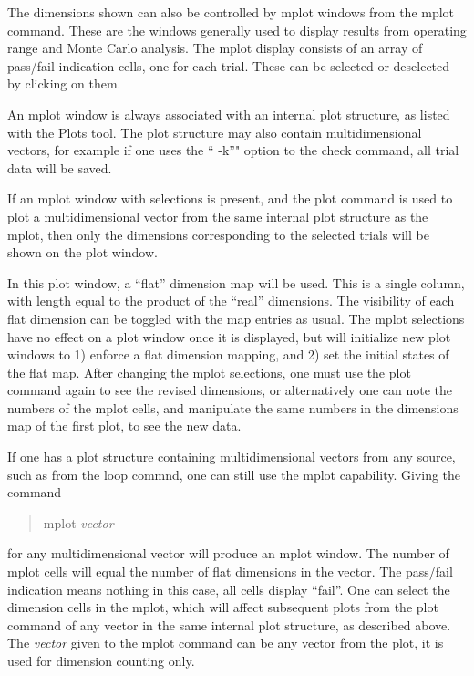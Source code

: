 The dimensions shown can also be controlled by mplot windows from the
{\cb mplot} command.  These are the windows generally used to display
results from operating range and Monte Carlo analysis.  The mplot
display consists of an array of pass/fail indication cells, one for
each trial.  These can be selected or deselected by clicking on them.

An mplot window is always associated with an internal plot structure,
as listed with the {\cb Plots} tool.  The plot structure may also
contain multidimensional vectors, for example if one uses the ``{\vt
-k}''" option to the {\cb check} command, all trial data will be
saved.

If an mplot window with selections is present, and the {\cb plot}
command is used to plot a multidimensional vector from the same
internal plot structure as the mplot, then only the dimensions
corresponding to the selected trials will be shown on the plot window.

In this plot window, a ``flat'' dimension map will be used.  This is a
single column, with length equal to the product of the ``real''
dimensions.  The visibility of each flat dimension can be toggled with
the map entries as usual.  The mplot selections have no effect on a
plot window once it is displayed, but will initialize new plot windows
to 1) enforce a flat dimension mapping, and 2) set the initial states
of the flat map.  After changing the mplot selections, one must use
the {\cb plot} command again to see the revised dimensions, or
alternatively one can note the numbers of the mplot cells, and
manipulate the same numbers in the dimensions map of the first plot,
to see the new data.

If one has a plot structure containing multidimensional vectors from
any source, such as from the {\cb loop} commnd, one can still use the
mplot capability.  Giving the command

\begin{quote}
{\vt mplot} {\it vector}
\end{quote}

for any multidimensional vector will produce an mplot window.  The
number of mplot cells will equal the number of flat dimensions in the
vector.  The pass/fail indication means nothing in this case, all
cells display ``fail''.  One can select the dimension cells in the
mplot, which will affect subsequent plots from the {\cb plot} command
of any vector in the same internal plot structure, as described above. 
The {\it vector} given to the {\cb mplot} command can be any vector
from the plot, it is used for dimension counting only.

